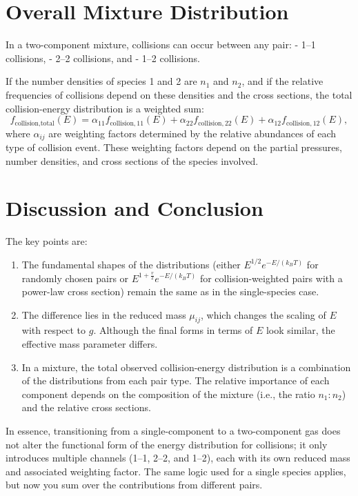 \section{Overall Mixture Distribution}

In a two-component mixture, collisions can occur between any pair:
- 1–1 collisions,
- 2–2 collisions, and
- 1–2 collisions.

If the number densities of species 1 and 2 are \( n_1 \) and \( n_2 \), and if the relative frequencies of collisions depend on these densities and the cross sections, the total collision-energy distribution is a weighted sum:
\[
f_{\text{collision,total}}(E) = \alpha_{11} f_{\text{collision},11}(E) + \alpha_{22} f_{\text{collision},22}(E) + \alpha_{12} f_{\text{collision},12}(E),
\]
where \(\alpha_{ij}\) are weighting factors determined by the relative abundances of each type of collision event. These weighting factors depend on the partial pressures, number densities, and cross sections of the species involved.

\section{Discussion and Conclusion}

The key points are:
\begin{enumerate}
  \item The fundamental shapes of the distributions (either \( E^{1/2} e^{-E/(k_B T)} \) for randomly chosen pairs or \( E^{1+\frac{v}{2}} e^{-E/(k_B T)} \) for collision-weighted pairs with a power-law cross section) remain the same as in the single-species case.

  \item The difference lies in the reduced mass \(\mu_{ij}\), which changes the scaling of \( E \) with respect to \( g \). Although the final forms in terms of \( E \) look similar, the effective mass parameter differs.

  \item In a mixture, the total observed collision-energy distribution is a combination of the distributions from each pair type. The relative importance of each component depends on the composition of the mixture (i.e., the ratio \( n_1:n_2 \)) and the relative cross sections.
\end{enumerate}

In essence, transitioning from a single-component to a two-component gas does not alter the functional form of the energy distribution for collisions; it only introduces multiple channels (1–1, 2–2, and 1–2), each with its own reduced mass and associated weighting factor. The same logic used for a single species applies, but now you sum over the contributions from different pairs.

